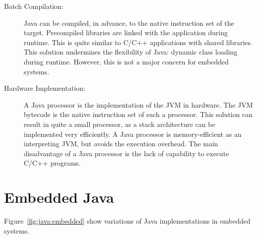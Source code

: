 \begin{description}
    \item[Batch Compilation:]
Java can be compiled, in advance, to the native instruction set of
the target. Precompiled libraries are linked with the application
during runtime. This is quite similar to C/C++ applications with
shared libraries. This solution undermines the flexibility of Java:
dynamic class loading during runtime. However, this is not a major
concern for embedded systems.


    \item[Hardware Implementation:]
A Java processor is the implementation of the JVM in hardware. The
JVM bytecode is the native instruction set of such a processor. This
solution can result in quite a small processor, as a stack
architecture can be implemented very efficiently. A Java processor
is memory-efficient as an interpreting JVM, but avoids the execution
overhead. The main disadvantage of a Java processor is the lack of
capability to execute C/C++ programs.

\end{description}

\section{Embedded Java}

Figure~\ref{fig:java:embedded} show variations of Java
implementations in embedded systems.

